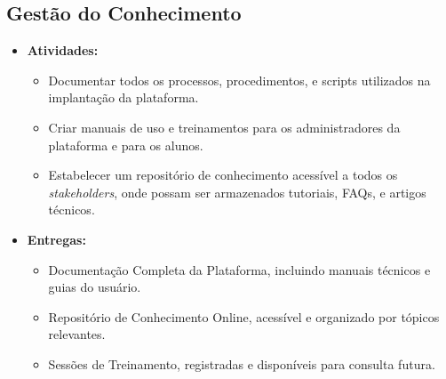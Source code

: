 \documentclass{article}
\begin{document}
\subsection{Gestão do Conhecimento}
\begin{itemize}
    \item \textbf{Atividades:}
    \begin{itemize}
        \item Documentar todos os processos, procedimentos, e scripts utilizados na implantação da plataforma.
        \item Criar manuais de uso e treinamentos para os administradores da plataforma e para os alunos.
        \item Estabelecer um repositório de conhecimento acessível a todos os \textit{stakeholders}, onde possam ser armazenados tutoriais, FAQs, e artigos técnicos.
    \end{itemize}
    \item \textbf{Entregas:}
    \begin{itemize}
        \item Documentação Completa da Plataforma, incluindo manuais técnicos e guias do usuário.
        \item Repositório de Conhecimento Online, acessível e organizado por tópicos relevantes.
        \item Sessões de Treinamento, registradas e disponíveis para consulta futura.
    \end{itemize}
\end{itemize}
\end{document}

